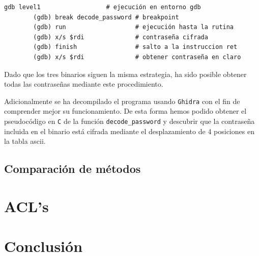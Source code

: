 \documentclass[]{article}
\begin{document}
\begin{center}
    \begin{lstlisting}[caption=comandos para la obtención de contraseña en gdb]
        gdb level1                  # ejecución en entorno gdb
        (gdb) break decode_password # breakpoint
        (gdb) run                   # ejecución hasta la rutina
        (gdb) x/s $rdi              # contraseña cifrada
        (gdb) finish                # salto a la instruccion ret
        (gdb) x/s $rdi              # obtener contraseña en claro
\end{lstlisting}
\end{center}

Dado que los tres binarios siguen la misma estrategia, ha sido posible obtener todas las contraseñas mediante este procedimiento.

Adicionalmente se ha decompilado el programa usando \texttt{Ghidra} con el fin de comprender mejor su funcionamiento. De esta forma hemos podido obtener el pseudocódigo en \texttt{C} de la función \texttt{decode\_password} y descubrir que la contraseña incluida en el binario está cifrada mediante el desplazamiento de 4 posiciones en la tabla ascii.

\subsection{Comparación de métodos}
\label{subsec:comparacion}

\section{ACL's}
\label{sec:acl}

\section{Conclusión}
\label{sec:conclusion}
\end{document}
